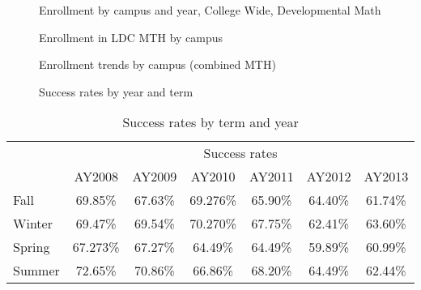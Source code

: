 \begin{figure}[!htb]
  \begin{widepage}
  \hfill
    \begin{minipage}{.27\textwidth}
    	 \centering
          
          \caption{Enrollment by campus and year, College Wide, Developmental Math}
          \label{app:fig:enrollmentDevelopCampus}
    \end{minipage}
  \hfill
    \begin{minipage}{.27\textwidth}
     	 \centering
          
          \caption{Enrollment in LDC MTH by campus}
          \label{app:fig:enrollmentLDCCampus}
    \end{minipage}
  \hfill

\vspace{2pc}

  \hfill
    \begin{minipage}{.27\textwidth}
     	 \centering
         
          \caption{Enrollment trends by campus (combined MTH)}
          \label{app:fig:totalenrollmentCampus}
    \end{minipage}
  \hfill
    \begin{minipage}{.27\textwidth}
    	 \centering
          
          \caption{Success rates by year and term}
    \end{minipage}
  \hfill
  \end{widepage}
\end{figure}


\begin{table}[!htb]
	\centering
	\caption{Success rates by term and year}
    \label{app:tab:successratesbyterm}
	\begin{tabular}{l*{6}{c}}
		\toprule
		& \multicolumn{6}{c}{Success rates}\\
		\cmidrule{2-7}
		       & AY2008  & AY2009  & AY2010  & AY2011  & AY2012  & AY2013  \\
		\cmidrule{2-7}
		Fall   & 69.85\% & 67.63\% & 69.276\% & 65.90\% & 64.40\% & 61.74\% \\ 
		Winter & 69.47\% & 69.54\% & 70.270\% & 67.75\% & 62.41\% & 63.60\% \\
		Spring & 67.273\% & 67.27\% & 64.49\% & 64.49\% & 59.89\% & 60.99\% \\
		Summer & 72.65\% & 70.86\% & 66.86\% & 68.20\% & 64.49\% & 62.44\% \\
		\bottomrule
	\end{tabular}
\end{table}
